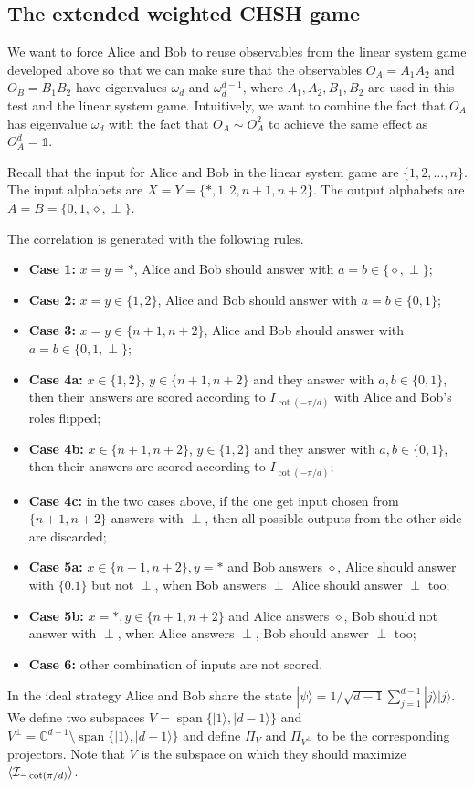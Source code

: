 \documentclass[11pt,letterpaper]{article}
\newcommand{\ket}[1]{|#1\rangle}
\DeclarePairedDelimiter{\ip}{\langle}{\rangle}
\DeclareMathOperator{\spn}{span}
\newcommand{\C}{\mathbb{C}}
\newcommand{\1}{\mathbb{1}}
\newcommand{\I}{\mathcal{I}}
\theoremstyle{definition}
\begin{document}
\subsection{The extended weighted CHSH game}
We want to force Alice and Bob to reuse observables 
from the linear system game developed above so that we can make sure that the observables 
$O_A = A_1A_2$ and $O_B =B_1B_2$ have eigenvalues $\omega_d$ and $\omega_d^{d-1}$,
where $A_1,A_2,B_1,B_2$ are used in this test and the linear system game.
Intuitively, we want to combine the fact that $O_A$ has eigenvalue $\omega_d$ with the fact that 
$O_A \sim O_A^2$ to achieve the same effect as $O_A^d = \1$.

Recall that the input for Alice and Bob in the linear system game are $\{1,2,\dots,n\}$.
The input alphabets are $X = Y = \{\ast, 1, 2, n+1,n+2\}$.
The output alphabets are $A = B = \{0, 1, \diamond, \perp\}$.

The correlation is generated with the following rules.
\begin{itemize}
	\item \textbf{Case 1:} $x = y = \ast$, Alice and Bob should answer with $a = b \in \{\diamond, \perp\}$;
	\item \textbf{Case 2:} $x = y \in \{1,2\}$, Alice and Bob should answer with $a = b \in \{0, 1\}$;
	\item \textbf{Case 3:} $x = y \in \{n+1, n+2\}$, Alice and Bob should answer with $a = b \in \{0, 1, \perp\}$;
	\item \textbf{Case 4a:} $x \in \{1,2\}$, $y \in \{n+1, n+2\}$ and they answer with $a,b \in \{0,1\}$, then
	their answers are scored according to $I_{\cot(-\pi/d)}$ with Alice and Bob's roles flipped;
	\item \textbf{Case 4b:} $x \in \{n+1, n+2\}$, $y \in \{1,2\}$ and they answer with $a,b \in \{0,1\}$, then
	their answers are scored according to $I_{\cot(-\pi/d)}$;
	\item \textbf{Case 4c:} in the two cases above, if the one get input chosen from $\{n+1,n+2\}$ answers
	 with $\perp$, then all possible outputs from the other side are discarded;
	\item \textbf{Case 5a:} $x \in \{n+1,n+2\}, y = \ast$ and Bob answers $\diamond$, Alice should answer with $\{0.1\}$ but not $\perp$, when Bob answers $\perp$ Alice should answer $\perp$ too;
	\item \textbf{Case 5b:} $x = \ast, y \in \{n+1, n+2\}$ and Alice answers $\diamond$, Bob should not answer with $\perp$,
	when Alice answers $\perp$, Bob should answer $\perp$ too;
	\item \textbf{Case 6:} other combination of inputs are not scored.
\end{itemize}
In the ideal strategy Alice and Bob share the state $\ket{\psi} =1/\sqrt{d-1} \sum_{j=1}^{d-1} \ket{j}\ket{j}$.
We define two subspaces $V = \spn\{\ket{1}, \ket{d-1}\}$ and $V^\perp = \C^{d-1} \setminus\spn\{\ket{1}, \ket{d-1}\}$ and
define $\Pi_V$ and $\Pi_{V^\perp}$ to be the corresponding projectors. Note that $V$ is the subspace on which they should maximize $\ip{\I_{-\cot(\pi/d)}}$.
\end{document}
